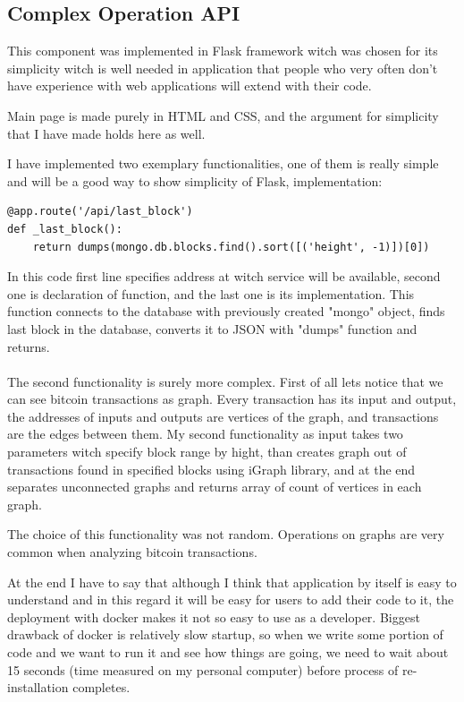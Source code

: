 \documentclass[12pt, en, eng]{mgr}
\begin{document}
\subsection{Complex Operation API}
This component was implemented in Flask framework witch was chosen for its simplicity witch is well needed in application that people who very often don't have experience with web applications will extend with their code. 

Main page is made purely in HTML and CSS, and the argument for simplicity that I have made holds here as well.

I have implemented two exemplary functionalities, one of them is really simple and will be a good way to show simplicity of Flask, implementation:
\begin{verbatim}
@app.route('/api/last_block')
def _last_block():
    return dumps(mongo.db.blocks.find().sort([('height', -1)])[0])
\end{verbatim}
In this code first line specifies address at witch service will be available, second one is declaration of function, and the last one is its implementation. This function connects to the database with previously created "mongo" object, finds last block in the database, converts it to JSON with "dumps" function and returns.
\\
\\
The second functionality is surely more complex. First of all lets notice that we can see bitcoin transactions as graph. Every transaction has its input and output, the addresses of inputs and outputs are vertices of the graph, and transactions are the edges between them. My second functionality as input takes two parameters witch specify block range by hight, than creates graph out of transactions found in specified blocks using iGraph library, and at the end separates unconnected graphs and returns array of count of vertices in each graph.

The choice of this functionality was not random. Operations on graphs are very common when analyzing bitcoin transactions.

At the end I have to say that although I think that application by itself is easy to understand and in this regard it will be easy for users to add their code to it, the deployment with docker makes it not so easy to use as a developer. Biggest drawback of docker is relatively slow startup, so when we write some portion of code and we want to run it and see how things are going, we need to wait about 15 seconds (time measured on my personal computer) before process of re-installation completes.
\end{document}
